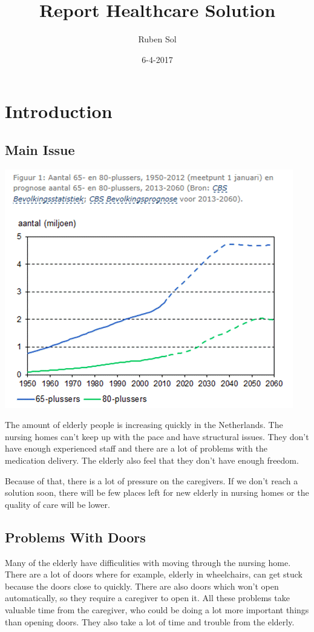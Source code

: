 \documentclass[14pt, a4paper]{extarticle}
\title{Report Healthcare Solution}
\date{6-4-2017}
\author{Ruben Sol}
\begin{document}
	\nocite{*}
	\maketitle
	
	\newpage
	\tableofcontents
	
	\newpage
	\section{Introduction}
	\subsection{Main Issue}
	
	\includegraphics[scale=0.75]{vergrijzing1}
	
	
	
	The amount of elderly people is increasing quickly in the Netherlands. \cite{bevolkingspiramide} The nursing homes can't keep up with the pace and have structural issues. They don't have enough experienced staff and there are a lot of problems with the medication delivery. The elderly also feel that they don't have enough freedom. \cite{structureleproblemen}	 
	
	Because of that, there is a lot of pressure on the caregivers. If we don't reach a solution soon, there will be few places left for new elderly in nursing homes or the quality of care will be lower.
	
	\subsection{Problems With Doors}
	Many of the elderly have difficulities with moving through the nursing home. There are a lot of doors where for example, elderly in wheelchairs, can get stuck because the doors close to quickly. There are also doors which won't open automatically, so they require a caregiver to open it. All these problems take valuable time from the caregiver, who could be doing a lot more important things than opening doors. They also take a lot of time and trouble from the elderly. 
	
\end{document}
